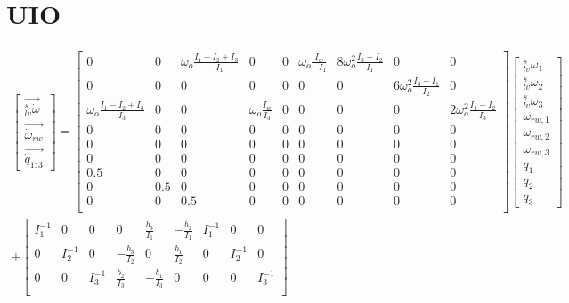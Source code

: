 \chapter{UIO}
\label{sec:UIO_deriv}


\tiny
\begin{align}
\begin{bmatrix}
\vec{_{lv}^s\dot{\omega}} \\
\vec{\dot{\omega}_{rw} } \\
\vec{\dot{q}_{1:3}}
\end{bmatrix} 
\nonumber
= \begin{bmatrix}
0 & 0 & \omega_o\frac{I_1 - I_2 + I_3}{-I_1} & 0 & 0 & \omega_o\frac{I_w}{-I_1} & 8\omega_o^2\frac{I_3 - I_2}{I_1} & 0 & 0 \\
0 & 0 &	0 & 0 & 0 &	0 & 0 &  6\omega_o^2\frac{I_3 - I_1}{I_2} & 0\\
\omega_o\frac{I_1 - I_2 + I_3}{I_3}  & 0 & 0 &  \omega_o\frac{I_w}{I_3} & 0 &	0 & 0 & 0 & 2\omega_o^2\frac{I_1 - I_2}{I_3}\\
0 & 0 &	0  & 0 & 0 & 0 & 0 & 0 & 0\\
0 & 0 &	0  & 0 & 0 & 0 & 0 & 0 & 0 \\
0 & 0 &	0 & 0 & 0 & 0 & 0 & 0 & 0\\
0.5 & 0 &	0 & 0 & 0 & 0 & 0 & 0 & 0 \\
0 & 0.5 &	0& 0 & 0 & 0 & 0 & 0 & 0 \\
0 & 0 &	0.5 & 0 & 0 & 0 & 0 & 0 & 0\\
\end{bmatrix}
\begin{bmatrix}
_{lv}^s\omega_1 \\
_{lv}^s\omega_2 \\
_{lv}^s\omega_3 \\
\omega_{rw,1} \\
\omega_{rw,2} \\
\omega_{rw,3} \\
q_1 \\
q_2 \\
q_3 
\end{bmatrix}
\\
\nonumber
+
\begin{bmatrix}
I_1^{-1} & 0 & 0 & 0 & \frac{b_3}{I_1} & -\frac{b_2}{I_1}	& I_1^{-1} & 0 & 0\\
0 & I_2^{-1} & 0 & - \frac{b_3}{I_2} & 0 &  \frac{b_1}{I_2} & 0 & I_2^{-1} & 0\\ 
0 & 0 & I_3^{-1} &  \frac{b_2}{I_3} &  -\frac{b_1}{I_3} & 0 & 0 & 0 & I_3^{-1} \\  

\end{bmatrix}
\end{align}
